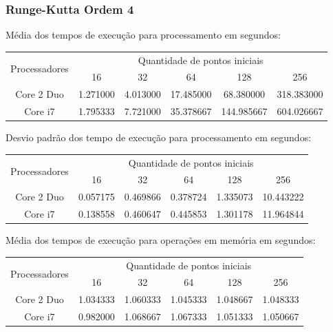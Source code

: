     \subsubsection{Runge-Kutta Ordem 4} 
    Média dos tempos de execução para processamento em segundos:\\
    \begin{tabular}{| c | c | c | c | c | c |}
      \hline
      \multirow{2}{*}{Processadores}& \multicolumn{5}{|c|}{Quantidade de pontos iniciais} \\ \cline{2-6}
      & 16 & 32 & 64 & 128 & 256 \\ \hline
      Core 2 Duo & 1.271000 & 4.013000 & 17.485000 & 68.380000 & 318.383000 \\ \hline
      Core i7 & 1.795333 & 7.721000 & 35.378667 & 144.985667 & 604.026667\\ \hline

      \hline
    \end{tabular}
    
    \hspace{1mm}\newline
    
    \noindent Desvio padrão dos tempo de execução para processamento em segundos:\\
    \begin{tabular}{| c | c | c | c | c | c |}
      \hline
      \multirow{2}{*}{Processadores}& \multicolumn{5}{|c|}{Quantidade de pontos iniciais} \\ \cline{2-6}
      & 16 & 32 & 64 & 128 & 256 \\ \hline
      Core 2 Duo & 0.057175 & 0.469866 & 0.378724 & 1.335073 & 10.443222 \\ \hline
      Core i7 & 0.138558 & 0.460647 & 0.445853 & 1.301178 & 11.964844 \\ \hline

      \hline
    \end{tabular}
    
    \hspace{1mm}\newline
    
    \noindent Média dos tempos de execução para operações em memória em segundos:\\
    \begin{tabular}{| c | c | c | c | c | c |}
      \hline
      \multirow{2}{*}{Processadores}& \multicolumn{5}{|c|}{Quantidade de pontos iniciais} \\ \cline{2-6}
      & 16 & 32 & 64 & 128 & 256 \\ \hline
      Core 2 Duo & 1.034333 & 1.060333 & 1.045333 & 1.048667 & 1.048333 \\ \hline
      Core i7 & 0.982000 & 1.068667 & 1.067333 & 1.051333 & 1.050667\\ \hline

      \hline
    \end{tabular}
    
